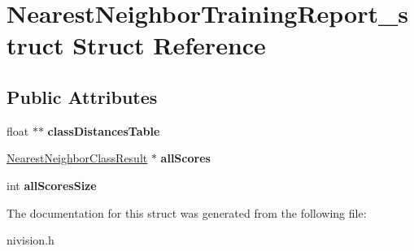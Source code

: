 \hypertarget{structNearestNeighborTrainingReport__struct}{
\section{NearestNeighborTrainingReport\_\-struct Struct Reference}
\label{structNearestNeighborTrainingReport__struct}
}
\subsection*{Public Attributes}
\begin{DoxyCompactItemize}
\item 
\hypertarget{structNearestNeighborTrainingReport__struct_a738b91029be72ef7a0ee2e6fc759949f}{
float $\ast$$\ast$ {\bfseries classDistancesTable}}
\label{structNearestNeighborTrainingReport__struct_a738b91029be72ef7a0ee2e6fc759949f}

\item 
\hypertarget{structNearestNeighborTrainingReport__struct_adad061c210cc13ad85ceaada0e801b9b}{
\hyperlink{structNearestNeighborClassResult__struct}{NearestNeighborClassResult} $\ast$ {\bfseries allScores}}
\label{structNearestNeighborTrainingReport__struct_adad061c210cc13ad85ceaada0e801b9b}

\item 
\hypertarget{structNearestNeighborTrainingReport__struct_a63df069ef1cb8eca759036389fdbbe71}{
int {\bfseries allScoresSize}}
\label{structNearestNeighborTrainingReport__struct_a63df069ef1cb8eca759036389fdbbe71}

\end{DoxyCompactItemize}


The documentation for this struct was generated from the following file:\begin{DoxyCompactItemize}
\item 
nivision.h\end{DoxyCompactItemize}
